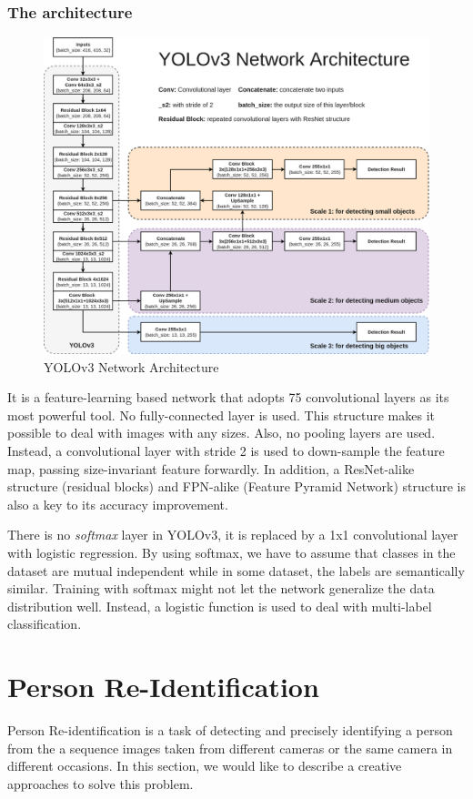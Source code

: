 \subsubsection{The architecture}
\begin{figure}[h!]
    \centering
    \includegraphics[scale=0.3]{Chapters/Fig/YOLOv3_architecture.png}
    \caption{YOLOv3 Network Architecture}
    \label{fig:yolo_arc}
\end{figure}
\par
 It is a feature-learning based network that adopts 75 convolutional layers as its most powerful
 tool. No fully-connected layer is used. This structure makes it possible to deal with images with
 any sizes. Also, no pooling layers are used. Instead, a convolutional layer with stride 2 is used
 to down-sample the feature map, passing size-invariant feature forwardly.  In addition, a
 ResNet-alike structure (residual blocks) and FPN-alike (Feature Pyramid Network) structure is also
 a key to its accuracy improvement. \par There is no \textit{softmax} layer in YOLOv3, it is
 replaced by a 1x1 convolutional layer with logistic regression. By using softmax, we have to
 assume that classes in the dataset are mutual independent while in some dataset, the labels are
 semantically similar. Training with softmax might not let the network generalize the data
 distribution well. Instead, a logistic function is used to deal with multi-label classification.

\section{Person Re-Identification}
\hspace{0.5cm}Person Re-identification is a task of detecting and precisely identifying a person from the a sequence images taken from different cameras or the same camera in different occasions. In this section, we would like to describe a creative approaches to solve this problem.
